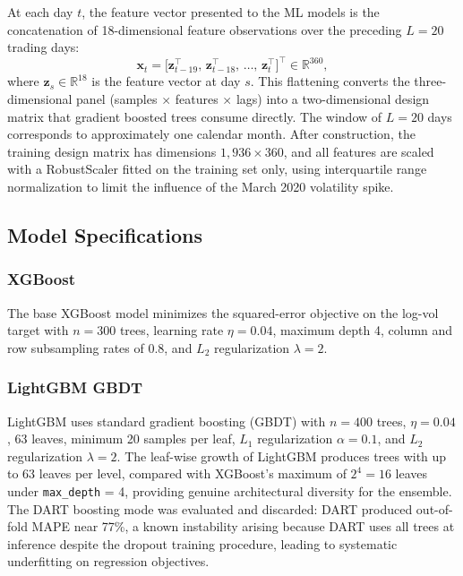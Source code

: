 \documentclass[12pt]{article}
\begin{document}
At each day $t$, the feature vector presented to the ML models is the
concatenation of 18-dimensional feature observations over the preceding
$L = 20$ trading days:
\begin{equation}
  \mathbf{x}_{t} =
    \bigl[\mathbf{z}_{t-19}^{\top},\,
          \mathbf{z}_{t-18}^{\top},\,\ldots,\,
          \mathbf{z}_{t}^{\top}\bigr]^{\top}
    \in \mathbb{R}^{360},
  \label{eq:lookback}
\end{equation}
where $\mathbf{z}_{s} \in \mathbb{R}^{18}$ is the feature vector at day $s$.
This flattening converts the three-dimensional panel (samples $\times$
features $\times$ lags) into a two-dimensional design matrix that gradient
boosted trees consume directly.  The window of $L = 20$ days corresponds to
approximately one calendar month.  After construction, the training design
matrix has dimensions $1{,}936 \times 360$, and all features are scaled with
a RobustScaler fitted on the training set only, using interquartile range
normalization to limit the influence of the March 2020 volatility spike.

\subsection{Model Specifications}

\subsubsection*{XGBoost}

The base XGBoost model minimizes the squared-error objective on the log-vol
target with $n = 300$ trees, learning rate $\eta = 0.04$, maximum depth 4,
column and row subsampling rates of 0.8, and $L_{2}$ regularization
$\lambda = 2$.

\subsubsection*{LightGBM GBDT}

LightGBM uses standard gradient boosting (GBDT) with $n = 400$ trees,
$\eta = 0.04$, 63 leaves, minimum 20 samples per leaf, $L_{1}$
regularization $\alpha = 0.1$, and $L_{2}$ regularization $\lambda = 2$.
The leaf-wise growth of LightGBM produces trees with up to 63 leaves per
level, compared with XGBoost's maximum of $2^{4} = 16$ leaves under
\texttt{max\_depth} = 4, providing genuine architectural diversity for the
ensemble.  The DART boosting mode was evaluated and discarded: DART produced
out-of-fold MAPE near 77\%, a known instability arising because DART uses all
trees at inference despite the dropout training procedure, leading to
systematic underfitting on regression objectives.
\end{document}
